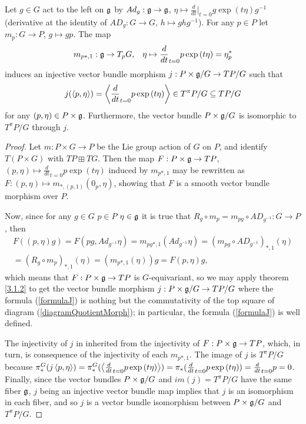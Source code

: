 \begin{theorem}
Let $g \in G$ act to the left on $\mathfrak{g}$ by $Ad_g: \mathfrak{g} \to \mathfrak{g}$, $\eta \mapsto \frac{d}{dt}|_{t=0} g \exp{(t \eta)} g^{-1}$ (derivative at the identity of $AD_g: G \to G$, $h \mapsto g h g^{-1}$). For any $p \in P$ let $m_p: G \to P$, $g \mapsto gp$. The map 
    \begin{align}
        m_{p*, 1}: \mathfrak{g} \to T_p G,& &\eta \mapsto \frac{d}{dt}_{t = 0}p \exp{(t \eta)} = \eta^*_p
    \end{align}
    induces an injective vector bundle morphism $j: P \times \mathfrak{g} / G \to TP/G$ such that 
    \begin{equation}\label{formulaJ}
        j(\left\langle p, \mathfrak{\eta} \right\rangle) = \left\langle \frac{d}{dt}_{t = 0} p \exp{(t \mathfrak{\eta})} \right\rangle \in T^\pi P/G \subseteq TP/G
    \end{equation} for any $(p, \mathfrak{\eta}) \in P \times \mathfrak{g}$. Furthermore, the vector bundle $P \times \mathfrak{g}/G$ is isomorphic to $T^\pi P/G$ through $j$.
\end{theorem}

\begin{proof}
Let $m: P \times G \to P$ be the Lie group action of $G$ on $P$, and identify $T(P \times G)$ with $TP \boxplus TG$. Then the map $F: P \times \mathfrak{g} \to TP$, $(p, \eta) \mapsto \frac{d}{dt}_{t = 0}p \exp{(t \eta)}$ induced by $m_{p*, 1}$ may be rewritten as $F: (p, \eta) \mapsto m_{*, (p, 1)}(0_p, \eta)$, showing that $F$ is a smooth vector bundle morphism over $P$.

Now, since for any $g \in G$ $p \in P$ $\eta \in \mathfrak{g}$ it is true that $R_g \circ m_p = m_{pg} \circ AD_{g^{-1}} : G \to P$, then 
\begin{multline*}
F((p, \eta)g)
= F(pg, Ad_{g^{-1}}\eta)
= m_{pg*, 1}(Ad_{g^{-1}}\eta)
= (m_{pg} \circ AD_{g^{-1}})_{*, 1}(\eta)\\
= (R_g \circ m_{p})_{*, 1}(\eta) 
= (m_{p*, 1}(\eta))g = F(p, \eta) g,
\end{multline*}
which means that $F: P \times \mathfrak{g} \to TP$ is $G$-equivariant, so we may apply theorem \ref{3.1.2} to get the vector bundle morphism $j: P \times \mathfrak{g}/G \to TP/G$ where the formula (\ref{formulaJ}) is nothing but the commutativity of the top square of diagram (\ref{diagramQuotientMorph}); in particular, the formula (\ref{formulaJ}) is well defined.

The injectivity of $j$ in inherited from the injectivity of $F: P \times \mathfrak{g} \to TP$, which, in turn, is consequence of the injectivity of each $m_{p*, 1}$. The image of $j$ is $T^\pi P/G$ because $\pi_*^G(j\left\langle p, \eta \right\rangle) = \pi_*^G(\left\langle \frac{d}{dt}_{t = 0}p \exp{(t \eta)} \right\rangle) = \pi_*(\frac{d}{dt}_{t = 0}p \exp{(t \eta)}) = \frac{d}{dt}_{t= 0} p = 0$. Finally, since the vector bundles $P \times \mathfrak{g}/G$ and $im(j) = T^\pi P/G$ have the same fiber $\mathfrak{g}$, $j$ being an injective vector bundle map implies that $j$ is an isomorphism in each fiber, and so $j$ is a vector bundle isomorphism between $P \times \mathfrak{g}/G$ and $T^\pi P/G$.
\end{proof}

